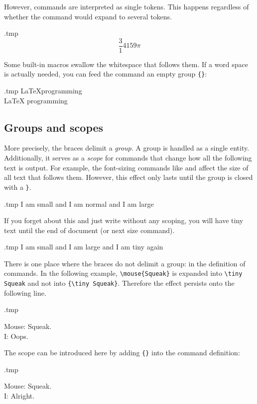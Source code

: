 However, commands are interpreted as single tokens.
This happens regardless of whether the command would expand to several tokens.

\begin{VerbatimOut}{\jobname.tmp}
\newcommand{\magic}{314 159}
\[ \frac \magic \pi \]
\end{VerbatimOut}
\ShowExample

\begin{gotcha}
Some built-in macros swallow the whitespace that follows them.
If a word space is actually needed, you can feed the command an empty group \verb|{}|:
\begin{VerbatimOut}{\jobname.tmp}
\LaTeX programming\\
\LaTeX{} programming
\end{VerbatimOut}
\ShowExample
\end{gotcha}


%
\subsection{Groups and scopes}

\label{ex:font scope}
More precisely, the braces delimit a \emph{group}.
A group is handled as a single entity.
Additionally, it serves as a \emph{scope} for commands that change
how all the following text is output.
For example, the font-sizing commands like  and 
affect the size of all text that follows them.
However, this effect only lasts until the group is closed with a \verb|}|.

\begin{VerbatimOut}{\jobname.tmp}
{\tiny I am small}
and I am normal
and {\Large I am large}
\end{VerbatimOut}
\ShowExample

If you forget about this and just write  without any scoping,
you will have tiny text until the end of document (or next size command).

\begin{VerbatimOut}{\jobname.tmp}
\tiny I am small and
{\Large I am large}
and I am tiny again
\end{VerbatimOut}
\ShowExample

There is one place where the braces do not delimit a group:
in the definition of commands.
In the following example, \verb|\mouse{Squeak}| is expanded into
\verb|\tiny Squeak| and not into \verb|{\tiny Squeak}|.
Therefore the effect persists onto the following line.
%
\begin{VerbatimOut}{\jobname.tmp}
\newcommand{\mouse}[1]{Mouse: \tiny#1.}

\mouse{Squeak}\\
I: Oops.
\end{VerbatimOut}
\ShowExample
%
The scope can be introduced here by adding \verb|{}| into the command definition:
%
\begin{VerbatimOut}{\jobname.tmp}
\newcommand{\mouse}[1]{{Mouse: \tiny#1.}}

\mouse{Squeak}\\
I: Alright.
\end{VerbatimOut}
\ShowExample

